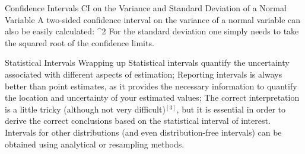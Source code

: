 \documentclass[t]{beamer}
\begin{document}

\begin{ftst}
{Confidence Intervals}
{CI on the Variance and Standard Deviation of a Normal Variable}
A two-sided confidence interval on the variance of a normal variable can also be easily calculated:
\beqs
{}\leq\sigma^2\leq{}
\eqs
\noindent For the standard deviation one simply needs to take the squared root of the confidence limits.
\end{ftst}


%	

%

\begin{ftst}
{Statistical Intervals}
{Wrapping up}
Statistical intervals quantify the uncertainty associated with different aspects of estimation;
\vone
Reporting intervals is always better than point estimates, as it provides the necessary information to quantify the location and uncertainty of your estimated values;
\vone
The correct interpretation is a little tricky (although not very difficult)$^{[3]}$, but it is essential in order to derive the correct conclusions based on the statistical interval of interest.
\vone
Intervals for other distributions (and even distribution-free intervals) can be obtained using analytical or resampling methods.
\end{ftst}
\end{document}

